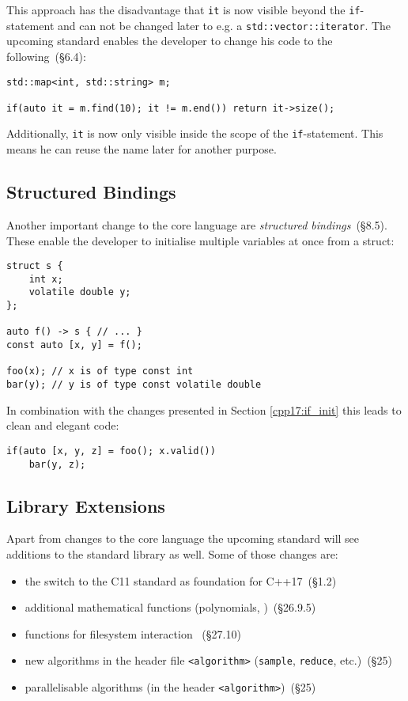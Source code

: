 \noindent This approach has the disadvantage that \texttt{it} is now visible beyond the \texttt{if}-statement and can not be changed later to e.g. a \texttt{std::vector::iterator}. The upcoming standard enables the developer to change his code to the following~\cite{cpp17std}(§6.4):

\begin{verbatim}
std::map<int, std::string> m;

if(auto it = m.find(10); it != m.end()) return it->size();
\end{verbatim}

\noindent Additionally, \texttt{it} is now only visible inside the scope of the \texttt{if}-statement. This means he can reuse the name later for another purpose.

\subsection{Structured Bindings}\label{cpp17:struct_bind}

Another important change to the core language are \textit{structured bindings}~\cite{cpp17std}(§8.5). These enable the developer to initialise multiple variables at once from a struct:

\begin{verbatim}
struct s {
    int x;
    volatile double y;
};

auto f() -> s { // ... }
const auto [x, y] = f();

foo(x); // x is of type const int
bar(y); // y is of type const volatile double
\end{verbatim}

\noindent In combination with the changes presented in Section \ref{cpp17:if_init} this leads to clean and elegant code:

\begin{verbatim}
if(auto [x, y, z] = foo(); x.valid())
    bar(y, z);
\end{verbatim}

\subsection{Library Extensions}\label{cpp17:lib_ext}

Apart from changes to the core language the upcoming standard will see additions to the standard library as well. Some of those changes are:

\begin{itemize}
\item the switch to the C11 standard as foundation for C++17~\cite{cpp17std}(§1.2)
\item additional mathematical functions (polynomials, )~\cite{cpp17std}(§26.9.5)
\item functions for filesystem interaction ~\cite{cpp17std}(§27.10)
\item new algorithms in the header file \texttt{<algorithm>} (\texttt{sample}, \texttt{reduce}, etc.)~\cite{cpp17std}(§25)
\item parallelisable algorithms (in the header \texttt{<algorithm>})~\cite{cpp17std}(§25)
\end{itemize}

